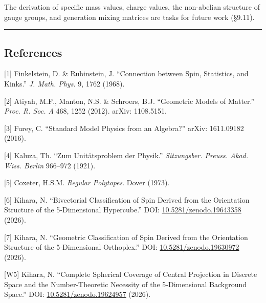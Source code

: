 \documentclass[
  a4paper,11pt]{article}
\theoremstyle{definition}
\theoremstyle{remark}
\begin{document}
The derivation of specific mass values, charge values, the non-abelian
structure of gauge groups, and generation mixing matrices are tasks for
future work (§9.11).

\begin{center}\rule{0.5\linewidth}{0.5pt}\end{center}

\subsection{References}\label{references}

{[}1{]} Finkelstein, D. \& Rubinstein, J. ``Connection between Spin,
Statistics, and Kinks.'' \emph{J. Math. Phys.} 9, 1762 (1968).

{[}2{]} Atiyah, M.F., Manton, N.S. \& Schroers, B.J. ``Geometric Models
of Matter.'' \emph{Proc. R. Soc. A} 468, 1252 (2012). arXiv: 1108.5151.

{[}3{]} Furey, C. ``Standard Model Physics from an Algebra?'' arXiv:
1611.09182 (2016).

{[}4{]} Kaluza, Th. ``Zum Unitätsproblem der Physik.''
\emph{Sitzungsber. Preuss. Akad. Wiss. Berlin} 966--972 (1921).

{[}5{]} Coxeter, H.S.M. \emph{Regular Polytopes}. Dover (1973).

{[}6{]} Kihara, N. ``Bivectorial Classification of Spin Derived from the
Orientation Structure of the 5-Dimensional Hypercube.'' DOI:
\href{https://doi.org/10.5281/zenodo.19643358}{10.5281/zenodo.19643358}
(2026).

{[}7{]} Kihara, N. ``Geometric Classification of Spin Derived from the
Orientation Structure of the 5-Dimensional Orthoplex.'' DOI:
\href{https://doi.org/10.5281/zenodo.19630972}{10.5281/zenodo.19630972}
(2026).

{[}W5{]} Kihara, N. ``Complete Spherical Coverage of Central Projection
in Discrete Space and the Number-Theoretic Necessity of the
5-Dimensional Background Space.'' DOI:
\href{https://doi.org/10.5281/zenodo.19624957}{10.5281/zenodo.19624957}
(2026).
\end{document}
